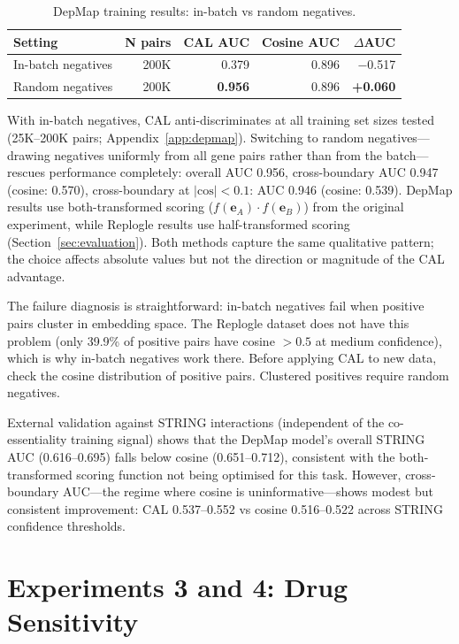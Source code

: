 \documentclass[11pt]{article}
\begin{document}
\begin{table}[h]
\centering
\caption{DepMap training results: in-batch vs random negatives.}
\label{tab:depmap}
\begin{tabular}{lrrrr}
\toprule
Setting & N pairs & CAL AUC & Cosine AUC & $\Delta$AUC \\
\midrule
In-batch negatives & 200K & 0.379 & 0.896 & $-$0.517 \\
Random negatives & 200K & \textbf{0.956} & 0.896 & \textbf{+0.060} \\
\bottomrule
\end{tabular}
\end{table}

With in-batch negatives, CAL anti-discriminates at all training set sizes tested (25K--200K pairs; Appendix~\ref{app:depmap}). Switching to random negatives---drawing negatives uniformly from all gene pairs rather than from the batch---rescues performance completely: overall AUC 0.956, cross-boundary AUC 0.947 (cosine: 0.570), cross-boundary at $|\text{cos}| < 0.1$: AUC 0.946 (cosine: 0.539). DepMap results use both-transformed scoring ($f(\mathbf{e}_A) \cdot f(\mathbf{e}_B)$) from the original experiment, while Replogle results use half-transformed scoring (Section~\ref{sec:evaluation}). Both methods capture the same qualitative pattern; the choice affects absolute values but not the direction or magnitude of the CAL advantage.

The failure diagnosis is straightforward: in-batch negatives fail when positive pairs cluster in embedding space. The Replogle dataset does not have this problem (only 39.9\% of positive pairs have cosine $> 0.5$ at medium confidence), which is why in-batch negatives work there. Before applying CAL to new data, check the cosine distribution of positive pairs. Clustered positives require random negatives.

External validation against STRING interactions (independent of the co-essentiality training signal) shows that the DepMap model's overall STRING AUC (0.616--0.695) falls below cosine (0.651--0.712), consistent with the both-transformed scoring function not being optimised for this task. However, cross-boundary AUC---the regime where cosine is uninformative---shows modest but consistent improvement: CAL 0.537--0.552 vs cosine 0.516--0.522 across STRING confidence thresholds.

\section{Experiments 3 and 4: Drug Sensitivity}
\label{sec:drugs}
\end{document}
